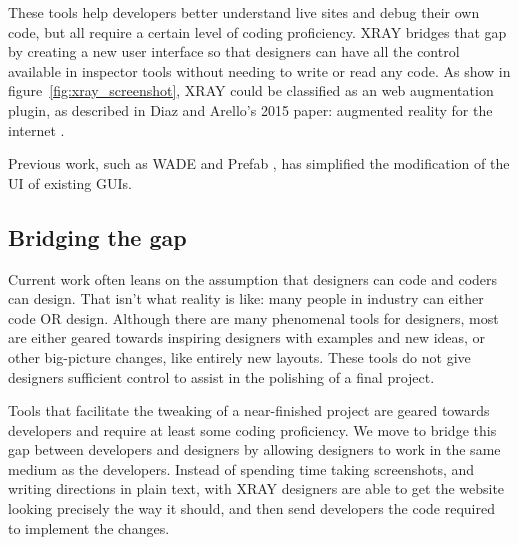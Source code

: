 \documentclass{sigchi}
\newcommand{\xray}{XRAY\xspace}
\begin{document}
These tools help developers better understand live sites and debug their own code, but all require a certain level of coding proficiency. \xray bridges that gap by creating a new user interface so that designers can have all the control available in inspector tools without needing to write or read any code. As show in figure~\ref{fig:xray_screenshot}, \xray could be classified as an web augmentation plugin, as described in Diaz and Arello's 2015 paper: augmented reality for the internet \cite{augmented_web_rationales_opporunities_challenges_Diaz_tweb_2015}. 

Previous work, such as WADE \cite{WADE_simplified_GUI_add_on_development_Meng_CHI_2014} and Prefab \cite{content_and_hierarchy_in_pixel_based_methords_for_reverse_engineering_interface_structure_Dixon_CHI_2011, prefab_original_paper_Dixon_CHI_2010}, has simplified the modification of the UI of existing GUIs. 

\subsection{Bridging the gap}
Current work often leans on the assumption that designers can code and coders can design. That isn't what reality is like: many people in industry can either code OR design. Although there are many phenomenal tools for designers, most are either geared towards inspiring designers with examples and new ideas, or other big-picture changes, like entirely new layouts. These tools do not give designers sufficient control to assist in the polishing of a final project. 

Tools that facilitate the tweaking of a near-finished project are geared towards developers and require at least some coding proficiency. We move to bridge this gap between developers and designers by allowing designers to work in the same medium as the developers. Instead of spending time taking screenshots, and writing directions in plain text, with \xray designers are able to get the website looking precisely the way it should, and then send developers the code required to implement the changes.  

\end{document}
